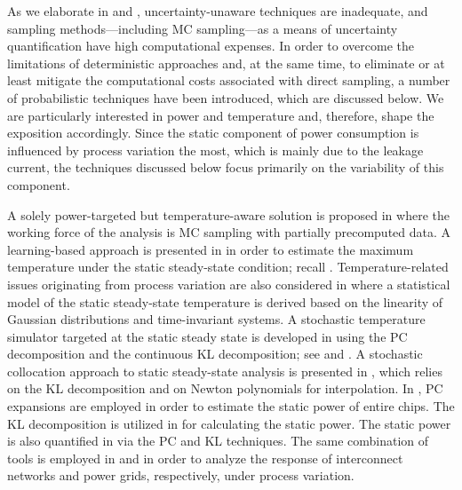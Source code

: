 As we elaborate in  and , uncertainty-unaware
techniques are inadequate, and sampling methods---including \ac{MC}
sampling---as a means of uncertainty quantification have high computational
expenses. In order to overcome the limitations of deterministic approaches and,
at the same time, to eliminate or at least mitigate the computational costs
associated with direct sampling, a number of probabilistic techniques have been
introduced, which are discussed below. We are particularly interested in power
and temperature and, therefore, shape the exposition accordingly. Since the
static component of power consumption is influenced by process variation the
most, which is mainly due to the leakage current, the techniques discussed below
focus primarily on the variability of this component.

A solely power-targeted but temperature-aware solution is proposed in
\cite{chandra2010} where the working force of the analysis is \ac{MC} sampling
with partially precomputed data. A learning-based approach is presented in
\cite{juan2011} in order to estimate the maximum temperature under the static
steady-state condition; recall .
Temperature-related issues originating from process variation are also
considered in \cite{juan2012} where a statistical model of the static
steady-state temperature is derived based on the linearity of Gaussian
distributions and time-invariant systems. A stochastic temperature simulator
targeted at the static steady state is developed in \cite{huang2009a} using the
\ac{PC} decomposition and the continuous \ac{KL} decomposition; see
 and . A stochastic
collocation \cite{maitre2010, xiu2010} approach to static steady-state analysis
is presented in \cite{lee2013}, which relies on the \ac{KL} decomposition and on
Newton polynomials for interpolation. In \cite{shen2009}, \ac{PC} expansions are
employed in order to estimate the static power of entire chips. The \ac{KL}
decomposition is utilized in \cite{bhardwaj2006} for calculating the static
power. The static power is also quantified in \cite{bhardwaj2008} via the
\ac{PC} and \ac{KL} techniques. The same combination of tools is employed in
\cite{vrudhula2006} and \cite{ghanta2006} in order to analyze the response of
interconnect networks and power grids, respectively, under process variation.

